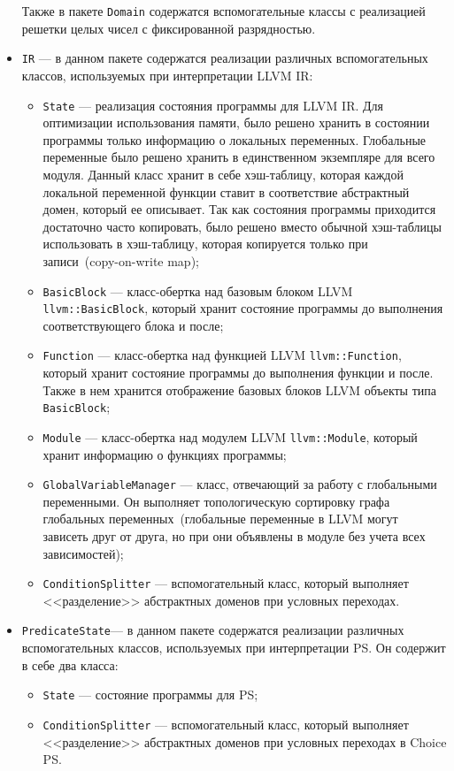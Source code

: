 \begin{itemize}
    Также в пакете \texttt{Domain} содержатся вспомогательные классы с 
    реализацией решетки целых чисел с фиксированной разрядностью.

\item \texttt{IR} --- в данном пакете содержатся реализации различных 
вспомогательных классов, используемых при интерпретации LLVM IR:
    \begin{itemize}
    \item \texttt{State} --- реализация состояния программы для LLVM IR. Для 
    оптимизации использования памяти, было решено хранить в состоянии 
    программы только информацию о локальных переменных. Глобальные переменные 
    было решено хранить в единственном экземпляре для всего модуля. Данный 
    класс хранит в себе хэш-таблицу, которая каждой локальной переменной 
    функции ставит в соответствие абстрактный домен, который ее описывает. Так 
    как состояния программы приходится достаточно часто копировать, было решено 
    вместо обычной хэш-таблицы использовать в хэш-таблицу, которая копируется 
    только при записи~(copy-on-write map);
    \item \texttt{BasicBlock} --- класс-обертка над базовым блоком LLVM
    \texttt{llvm::BasicBlock}, который хранит состояние программы до
    выполнения соответствующего блока и после;
    \item \texttt{Function} --- класс-обертка над функцией LLVM
    \texttt{llvm::Function}, который хранит состояние программы до 
    выполнения функции и после. Также в нем хранится отображение базовых блоков
    LLVM объекты типа \texttt{BasicBlock};
    \item \texttt{Module} --- класс-обертка над модулем LLVM
    \texttt{llvm::Module}, который хранит информацию о функциях 
    программы;
    \item \texttt{GlobalVariableManager} --- класс, отвечающий за работу с 
    глобальными переменными. Он выполняет топологическую сортировку графа
    глобальных переменных~(глобальные переменные в LLVM могут зависеть друг от
    друга, но при они объявлены в модуле без учета всех зависимостей);
    \item \texttt{ConditionSplitter} --- вспомогательный класс, который 
    выполняет <<разделение>> абстрактных доменов при условных переходах.
    \end{itemize}
\item \texttt{PredicateState}--- в данном пакете содержатся реализации 
различных вспомогательных классов, используемых при интерпретации PS. Он 
содержит в себе два класса:
    \begin{itemize}
    \item \texttt{State} --- состояние программы для PS;
    \item \texttt{ConditionSplitter} --- вспомогательный класс, который 
    выполняет <<разделение>> абстрактных доменов при условных переходах в 
    Choice PS.
    \end{itemize}
\end{itemize}

